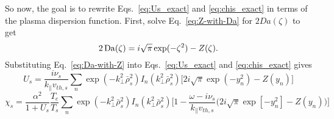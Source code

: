 So now, the goal is to rewrite Eqs.~\ref{eq:Us_exact} and \ref{eq:chis_exact} in terms of the plasma dispersion function.
First, solve Eq.~\ref{eq:Z-with-Da} for $2Da(\zeta)$ to get
\begin{equation}
	2\operatorname{Da}(\zeta) = i\sqrt{\pi} \exp(-\zeta^2) -Z(\zeta).
	\label{eq:Da-with-Z}
\end{equation}
Substituting Eq.~\ref{eq:Da-with-Z} into Eqs.~\ref{eq:Us_exact} and \ref{eq:chis_exact} gives
\begin{equation}
	U_s = 
	\frac{i \nu_{s}}{k_\parallel v_{th,s}} 
	\sum_n \exp(-k_\perp^2 \bar{\rho}_s^2) I_n (k_\perp^2 \bar{\rho}_s^2) 
	\Big[ 2 i \sqrt{\pi} \exp(-y_n^2) - Z(y_n)\Big]
	\label{eq:Us_exact_Z}
\end{equation}
\begin{equation}
	\chi_s = 
	\frac{\alpha^2}{1+U_s} \frac{T_e}{T_s} 
	\sum_n \exp(-k_\perp^2 \bar{\rho}_s^2) I_n (k_\perp^2 \bar{\rho}_s^2) 
	\bigg[ 1 - \frac{\omega-i\nu_s}{k_\parallel v_{th,s}} 
	\Big( 2 i \sqrt{\pi} \exp[-y_n^2] - Z(y_n) \Big)
	\bigg]
	\label{eq:chis_exact_Z}
\end{equation}




